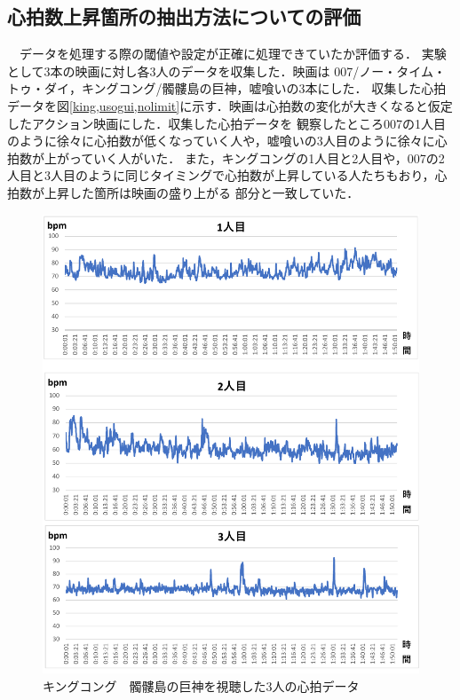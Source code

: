 \subsection{心拍数上昇箇所の抽出方法についての評価}
　データを処理する際の閾値や設定が正確に処理できていたか評価する．
実験として3本の映画に対し各3人のデータを収集した．映画は 007/ノー・タイム・トゥ・ダイ，キングコング/髑髏島の巨神，嘘喰いの3本にした．
収集した心拍データを図\ref{king,usogui,nolimit}に示す．映画は心拍数の変化が大きくなると仮定したアクション映画にした．収集した心拍データを
観察したところ007の1人目のように徐々に心拍数が低くなっていく人や，嘘喰いの3人目のように徐々に心拍数が上がっていく人がいた．
また，キングコングの1人目と2人目や，007の2人目と3人目のように同じタイミングで心拍数が上昇している人たちもおり，心拍数が上昇した箇所は映画の盛り上がる
部分と一致していた．
\begin{figure}[H]
    \centering
    \includegraphics[width=14cm]{images/chapter4/kingkong2.pdf}
    \caption{キングコング　髑髏島の巨神を視聴した3人の心拍データ}
    \label{king}
\end{figure}
